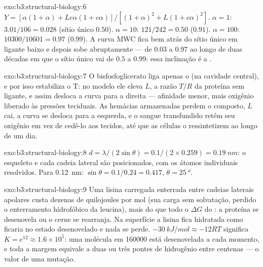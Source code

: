 \begin{solution}{exo:b3:structural-biology:6}
$Y = [\alpha(1+\alpha) + Lc\alpha(1+c\alpha)]/[(1+\alpha)^{2} +
L(1+c\alpha)^{2}]$. $\alpha = 1$: $3.01/106 = 0.028$ (sítio único
$0.50$). $\alpha = 10$: $121/242 = 0.50$ ($0.91$). $\alpha = 100$:
$\num{10300}/\num{10601} = 0.97$ ($0.99$). A curva MWC fica bem atrás
do sítio único em ligante baixo e depois sobe abruptamente --- de
$0.03$ a $0.97$ ao longo de duas décadas em que o sítio único vai de
$0.5$ a $0.99$: essa inclinação é a .
\end{solution}

\begin{solution}{exo:b3:structural-biology:7}
O bisfosfoglicerato liga apenas o  (na cavidade central), e por
isso estabiliza o T: no modelo ele eleva $L$, a razão $T/R$ da proteína
sem ligante, e assim desloca a curva para a direita --- afinidade menor,
mais oxigênio liberado às pressões teciduais. As hemácias armazenadas
perdem o composto, $L$ cai, a curva se desloca para a esquerda, e o
sangue transfundido retém seu oxigênio em vez de cedê-lo aos tecidos,
até que as células o ressintetizem ao longo de um dia.
\end{solution}

\begin{solution}{exo:b3:structural-biology:8}
$d = \lambda/(2\sin\theta) = 0.1/(2\times 0.259) = \qty{0.19}{nm}$: o
esqueleto e cada cadeia lateral são posicionados, com os átomos
individuais resolvidos. Para \qty{0.12}{nm}: $\sin\theta = 0.1/0.24 = 0.417$, $\theta =
\qty{25}{\degree}$.
\end{solution}

\begin{solution}{exo:b3:structural-biology:9}
Uma lisina carregada enterrada entre cadeias laterais apolares custa
dezenas de quilojoules por mol (sua carga sem solvatação, perdido o
enterramento hidrofóbico da leucina), mais do que todo o $\Delta G$ do
: a proteína se desenovela ou o cerne se rearranja. Na
superfície a lisina fica hidratada como ficaria no estado desenovelado
e nada se perde. $\qty{-30}{kJ/mol} \approx -12RT$ significa
$K = e^{12} \approx 1.6\times
10^{5}$: uma molécula em \num{160000}
está desenovelada a cada momento, e toda a margem equivale a duas ou
três pontes de hidrogênio entre centenas --- o valor de uma mutação.
\end{solution}

